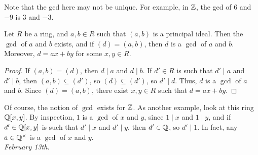 Note that the gcd here may not be unique. For example, in $\mathbb{Z}$, the gcd of $6$ and $-9$ is $3$ and $-3$.

\begin{proposition}
    Let $R$ be a ring, and $a,b \in R$ such that $(a,b)$ is a principal ideal. Then the $\gcd$ of $a$ and $b$ exists, and if $(d) = (a,b)$, then $d$ is a $\gcd$ of $a$ and $b$. Moreover, $d = ax+by$ for some $x,y \in R$.
\end{proposition}

\begin{proof}
    If $(a,b) = (d)$, then $d \mid a$ and $d \mid b$. If $d' \in R$ is such that $d' \mid a$ and $d' \mid b$, then $(a,b) \subseteq (d')$, so $(d) \subseteq (d')$, so $d' \mid d$. Thus, $d$ is a $\gcd$ of $a$ and $b$. Since $(d) = (a,b)$, there exist $x,y \in R$ such that $d = ax + by$.
\end{proof}

Of course, the notion of $\gcd$ exists for $\mathbb{Z}$. As another example, look at this ring $\mathbb{Q}[x,y]$. By inspection, $1$ is a $\gcd$ of $x$ and $y$, since $1 \mid x$ and $1 \mid y$, and if $d' \in \mathbb{Q}[x,y]$ is such that $d' \mid x$ and $d' \mid y$, then $d' \in \mathbb{Q}$, so $d' \mid 1$. In fact, any $a \in \mathbb{Q}^{\times}$ is a $\gcd$ of $x$ and $y$.
\\

\textit{February 13th.}

